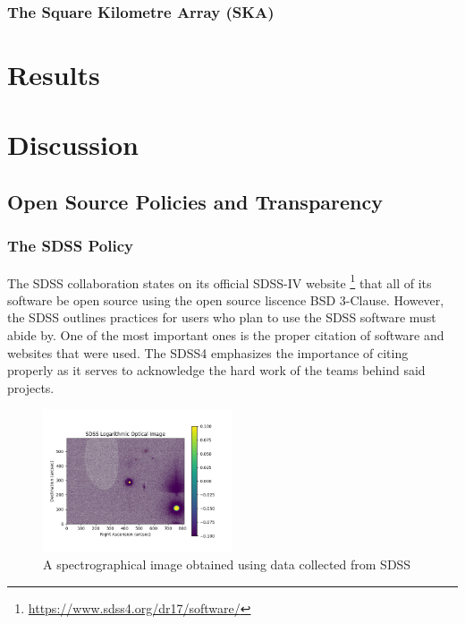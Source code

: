 \documentclass[preprint,linenumbers, longauthor]{aastex631}
\begin{document}
\subsubsection{The Square Kilometre Array (SKA)}

\section{Results}
\subsection{}

\section{Discussion}
\subsection{Open Source Policies and Transparency}

\subsubsection{The SDSS Policy}

The SDSS collaboration states on its official SDSS-IV website \footnote{\url{https://www.sdss4.org/dr17/software/}} that all of its software be open source using the open source liscence BSD 3-Clause.
However, the SDSS outlines practices for users who plan to use the SDSS software must abide by. One of the most important ones is the proper citation of software and websites that were used. 
The SDSS4 emphasizes the importance of citing properly as it serves to acknowledge the hard work of the teams behind said projects.


\begin{figure}[h!]
  \centering
  \includegraphics[width=0.5\textwidth]{SDSS_Optical_Image.png}
  \caption{A spectrographical image obtained using data collected from SDSS}
  \label{fig:SDSS_Optical_Image}
\end{figure}
\end{document}
